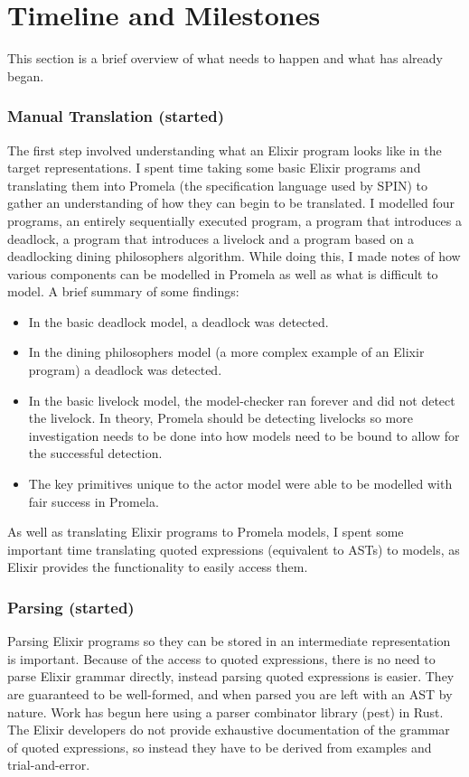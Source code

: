 \section{Timeline and Milestones}
This section is a brief overview of what needs to happen and what has already began.
\subsubsection{Manual Translation (started)}
The first step involved understanding what an Elixir program looks like in the target representations. I spent time taking some basic Elixir programs and translating them into Promela (the specification language used by SPIN) to gather an understanding of how they can begin to be translated. I modelled four programs, an entirely sequentially executed program, a program that introduces a deadlock, a program that introduces a livelock and a program based on a deadlocking dining philosophers algorithm. While doing this, I made notes of how various components can be modelled in Promela as well as what is difficult to model. A brief summary of some findings:
\begin{itemize}
    \item In the basic deadlock model, a deadlock was detected.
    \item In the dining philosophers model (a more complex example of an Elixir program) a deadlock was detected.
    \item In the basic livelock model, the model-checker ran forever and did not detect the livelock. In theory, Promela should be detecting livelocks so more investigation needs to be done into how models need to be bound to allow for the successful detection.
    \item The key primitives unique to the actor model were able to be modelled with fair success in Promela.
\end{itemize}
As well as translating Elixir programs to Promela models, I spent some important time translating quoted expressions (equivalent to ASTs) to models, as Elixir provides the functionality to easily access them.
\subsubsection{Parsing (started)}
Parsing Elixir programs so they can be stored in an intermediate representation is important. Because of the access to quoted expressions, there is no need to parse Elixir grammar directly, instead parsing quoted expressions is easier. They are guaranteed to be well-formed, and when parsed you are left with an AST by nature. Work has begun here using a parser combinator library (pest) in Rust. The Elixir developers do not provide exhaustive documentation of the grammar of quoted expressions, so instead they have to be derived from examples and trial-and-error.

